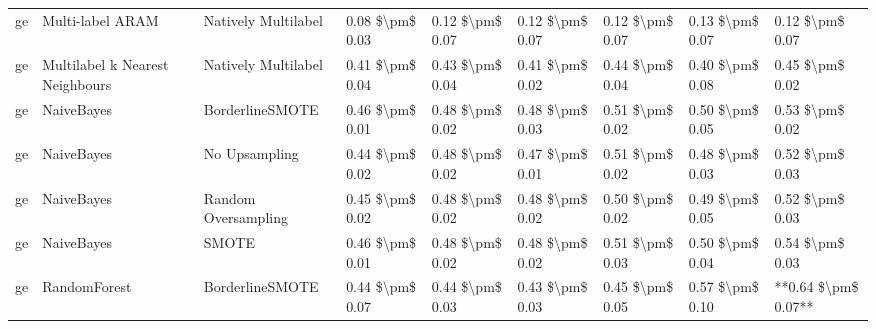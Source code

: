 \begin{tabular}{lllllllll}
      ge &                Multi-label ARAM &           Natively Multilabel & 0.08 \$\textbackslash pm\$ 0.03 &           0.12 \$\textbackslash pm\$ 0.07 &       0.12 \$\textbackslash pm\$ 0.07 &        0.12 \$\textbackslash pm\$ 0.07 &                         0.13 \$\textbackslash pm\$ 0.07 &     0.12 \$\textbackslash pm\$ 0.07 \\
      ge & Multilabel k Nearest Neighbours &           Natively Multilabel & 0.41 \$\textbackslash pm\$ 0.04 &           0.43 \$\textbackslash pm\$ 0.04 &       0.41 \$\textbackslash pm\$ 0.02 &        0.44 \$\textbackslash pm\$ 0.04 &                         0.40 \$\textbackslash pm\$ 0.08 &     0.45 \$\textbackslash pm\$ 0.02 \\
      ge &                      NaiveBayes &               BorderlineSMOTE & 0.46 \$\textbackslash pm\$ 0.01 &           0.48 \$\textbackslash pm\$ 0.02 &       0.48 \$\textbackslash pm\$ 0.03 &        0.51 \$\textbackslash pm\$ 0.02 &                         0.50 \$\textbackslash pm\$ 0.05 &     0.53 \$\textbackslash pm\$ 0.02 \\
      ge &                      NaiveBayes &                 No Upsampling & 0.44 \$\textbackslash pm\$ 0.02 &           0.48 \$\textbackslash pm\$ 0.02 &       0.47 \$\textbackslash pm\$ 0.01 &        0.51 \$\textbackslash pm\$ 0.02 &                         0.48 \$\textbackslash pm\$ 0.03 &     0.52 \$\textbackslash pm\$ 0.03 \\
      ge &                      NaiveBayes &           Random Oversampling & 0.45 \$\textbackslash pm\$ 0.02 &           0.48 \$\textbackslash pm\$ 0.02 &       0.48 \$\textbackslash pm\$ 0.02 &        0.50 \$\textbackslash pm\$ 0.02 &                         0.49 \$\textbackslash pm\$ 0.05 &     0.52 \$\textbackslash pm\$ 0.03 \\
      ge &                      NaiveBayes &                         SMOTE & 0.46 \$\textbackslash pm\$ 0.01 &           0.48 \$\textbackslash pm\$ 0.02 &       0.48 \$\textbackslash pm\$ 0.02 &        0.51 \$\textbackslash pm\$ 0.03 &                         0.50 \$\textbackslash pm\$ 0.04 &     0.54 \$\textbackslash pm\$ 0.03 \\
      ge &                    RandomForest &               BorderlineSMOTE & 0.44 \$\textbackslash pm\$ 0.07 &           0.44 \$\textbackslash pm\$ 0.03 &       0.43 \$\textbackslash pm\$ 0.03 &        0.45 \$\textbackslash pm\$ 0.05 &                         0.57 \$\textbackslash pm\$ 0.10 & **0.64 \$\textbackslash pm\$ 0.07** \\

\end{tabular}
